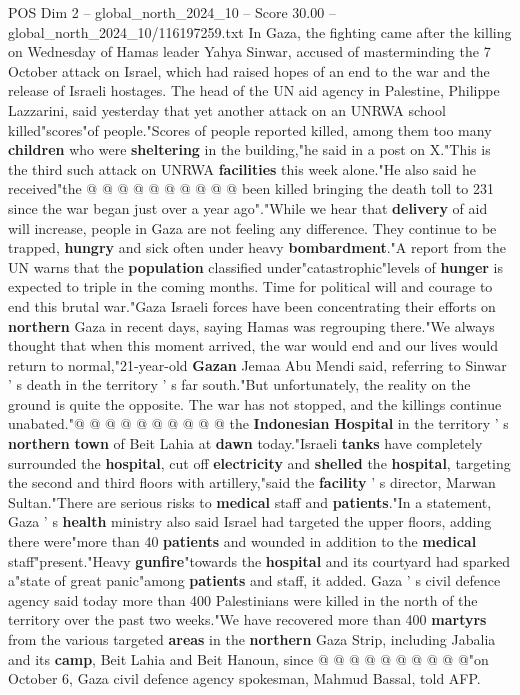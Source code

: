 \begin{textsample}{POS Dim 2 – global\_north\_2024\_10 – Score 30.00 – global\_north\_2024\_10/116197259.txt}
In Gaza, the fighting came after the killing on Wednesday of Hamas leader Yahya Sinwar, accused of masterminding the 7 October attack on Israel, which had raised hopes of an end to the war and the release of Israeli hostages.
The head of the UN aid agency in Palestine, Philippe Lazzarini, said yesterday that yet another attack on an UNRWA school killed"scores"of people."Scores of people reported killed, among them too many \textbf{children} who were \textbf{sheltering} in the building,"he said in a post on X."This is the third such attack on UNRWA \textbf{facilities} this week alone."He also said he received"the @ @ @ @ @ @ @ @ @ @ been killed bringing the death toll to 231 since the war began just over a year ago"."While we hear that \textbf{delivery} of aid will increase, people in Gaza are not feeling any difference.
They continue to be trapped, \textbf{hungry} and sick often under heavy \textbf{bombardment}."A report from the UN warns that the \textbf{population} classified under"catastrophic"levels of \textbf{hunger} is expected to triple in the coming months.
Time for political will and courage to end this brutal war."Gaza Israeli forces have been concentrating their efforts on \textbf{northern} Gaza in recent days, saying Hamas was regrouping there."We always thought that when this moment arrived, the war would end and our lives would return to normal,"21-year-old \textbf{Gazan} Jemaa Abu Mendi said, referring to Sinwar ' s death in the territory ' s far south."But unfortunately, the reality on the ground is quite the opposite.
The war has not stopped, and the killings continue unabated."@ @ @ @ @ @ @ @ @ @ the \textbf{Indonesian} \textbf{Hospital} in the territory ' s \textbf{northern} \textbf{town} of Beit Lahia at \textbf{dawn} today."Israeli \textbf{tanks} have completely surrounded the \textbf{hospital}, cut off \textbf{electricity} and \textbf{shelled} the \textbf{hospital}, targeting the second and third floors with artillery,"said the \textbf{facility} ' s director, Marwan Sultan."There are serious risks to \textbf{medical} staff and \textbf{patients}."In a statement, Gaza ' s \textbf{health} ministry also said Israel had targeted the upper floors, adding there were"more than 40 \textbf{patients} and wounded in addition to the \textbf{medical} staff"present."Heavy \textbf{gunfire}"towards the \textbf{hospital} and its courtyard had sparked a"state of great panic"among \textbf{patients} and staff, it added.
Gaza ' s civil defence agency said today more than 400 Palestinians were killed in the north of the territory over the past two weeks."We have recovered more than 400 \textbf{martyrs} from the various targeted \textbf{areas} in the \textbf{northern} Gaza Strip, including Jabalia and its \textbf{camp}, Beit Lahia and Beit Hanoun, since @ @ @ @ @ @ @ @ @ @"on October 6, Gaza civil defence agency spokesman, Mahmud Bassal, told AFP.

\end{textsample}
